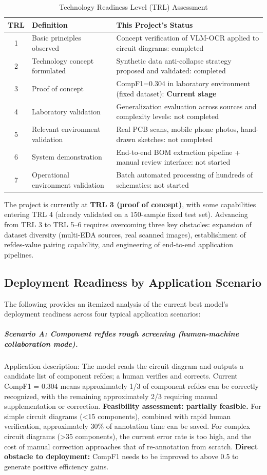 \begin{table}[h]
\centering
\caption{Technology Readiness Level (TRL) Assessment}
\begin{tabular}{clp{7cm}}
\toprule
\textbf{TRL} & \textbf{Definition} & \textbf{This Project's Status} \\
\midrule
1 & Basic principles observed & Concept verification of VLM-OCR applied to circuit diagrams: completed \\
2 & Technology concept formulated & Synthetic data anti-collapse strategy proposed and validated: completed \\
3 & Proof of concept & CompF1=0.304 in laboratory environment (fixed dataset): \textbf{Current stage} \\
4 & Laboratory validation & Generalization evaluation across sources and complexity levels: not completed \\
5 & Relevant environment validation & Real PCB scans, mobile phone photos, hand-drawn sketches: not completed \\
6 & System demonstration & End-to-end BOM extraction pipeline + manual review interface: not started \\
7 & Operational environment validation & Batch automated processing of hundreds of schematics: not started \\
\bottomrule
\end{tabular}
\end{table}

The project is currently at \textbf{TRL 3 (proof of concept)}, with some capabilities entering TRL 4 (already validated on a 150-sample fixed test set). Advancing from TRL 3 to TRL 5--6 requires overcoming three key obstacles: expansion of dataset diversity (multi-EDA sources, real scanned images), establishment of refdes-value pairing capability, and engineering of end-to-end application pipelines.

\subsection{Deployment Readiness by Application Scenario}

The following provides an itemized analysis of the current best model's deployment readiness across four typical application scenarios:

\subparagraph{Scenario A: Component refdes rough screening (human-machine collaboration mode).}
Application description: The model reads the circuit diagram and outputs a candidate list of component refdes; a human verifies and corrects. Current CompF1 = 0.304 means approximately 1/3 of component refdes can be correctly recognized, with the remaining approximately 2/3 requiring manual supplementation or correction.
\textbf{Feasibility assessment: partially feasible.} For simple circuit diagrams (<15 components), combined with rapid human verification, approximately 30\% of annotation time can be saved. For complex circuit diagrams (>35 components), the current error rate is too high, and the cost of manual correction approaches that of re-annotation from scratch.
\textbf{Direct obstacle to deployment:} CompF1 needs to be improved to above 0.5 to generate positive efficiency gains.


